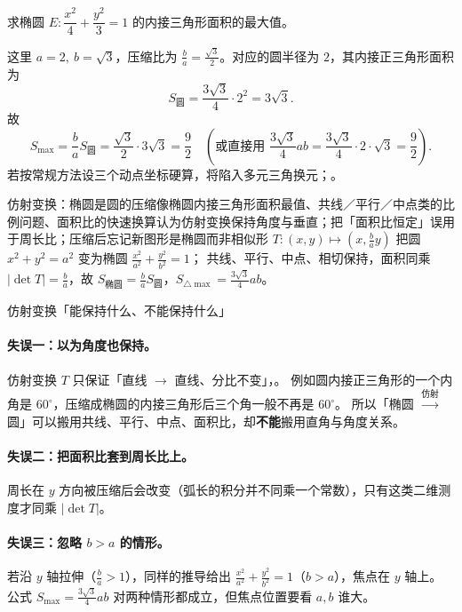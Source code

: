 \begin{explore}
\begin{example}
求椭圆 $E:\dfrac{x^2}{4}+\dfrac{y^2}{3}=1$ 的内接三角形面积的最大值。
\end{example}
\begin{solution}
这里 $a=2,\ b=\sqrt3$，压缩比为 $\frac{b}{a}=\frac{\sqrt3}{2}$。对应的圆半径为 $2$，其内接正三角形面积为
\[
  S_{\text{圆}}=\frac{3\sqrt3}{4}\cdot 2^2=3\sqrt3.
\]
故
\[
  S_{\max}=\frac{b}{a}S_{\text{圆}}=\frac{\sqrt3}{2}\cdot 3\sqrt3=\frac92
  \quad\left(\text{或直接用 }\frac{3\sqrt3}{4}ab=\frac{3\sqrt3}{4}\cdot2\cdot\sqrt3=\frac92\right).
\]
若按常规方法设三个动点坐标硬算，将陷入多元三角换元；。
\end{solution}

\begin{conccard}[一级]{仿射变换：椭圆是圆的压缩像}{椭圆内接三角形面积最值、共线／平行／中点类的比例问题、面积比的快速换算}{认为仿射变换保持角度与垂直；把「面积比恒定」误用于周长比；压缩后忘记新图形是椭圆而非相似形}
$T:(x,y)\mapsto\left(x,\frac{b}{a}y\right)$ 把圆 $x^2+y^2=a^2$ 变为椭圆 $\frac{x^2}{a^2}+\frac{y^2}{b^2}=1$；
共线、平行、中点、相切保持，面积同乘 $|\det T|=\frac{b}{a}$，故 $S_{\text{椭圆}}=\frac{b}{a}S_{\text{圆}}$，$S_{\triangle\max}=\frac{3\sqrt3}{4}ab$。
\end{conccard}

\begin{commonerror}{仿射变换「能保持什么、不能保持什么」}
\paragraph{失误一：以为角度也保持。}
仿射变换 $T$ 只保证「直线 $\to$ 直线、分比不变」，。
例如圆内接正三角形的一个内角是 $60^\circ$，压缩成椭圆的内接三角形后三个角一般不再是 $60^\circ$。
所以「椭圆 $\xrightarrow{\text{仿射}}$ 圆」可以搬用共线、平行、中点、面积比，却\textbf{不能}搬用直角与角度关系。
\paragraph{失误二：把面积比套到周长比上。}
周长在 $y$ 方向被压缩后会改变（弧长的积分并不同乘一个常数），只有这类二维测度才同乘 $|\det T|$。
\paragraph{失误三：忽略 $b>a$ 的情形。}
若沿 $y$ 轴拉伸（$\frac{b}{a}>1$），同样的推导给出 $\frac{x^2}{a^2}+\frac{y^2}{b^2}=1$（$b>a$），焦点在 $y$ 轴上。
公式 $S_{\max}=\frac{3\sqrt3}{4}ab$ 对两种情形都成立，但焦点位置要看 $a,b$ 谁大。
\end{commonerror}


\end{explore}
